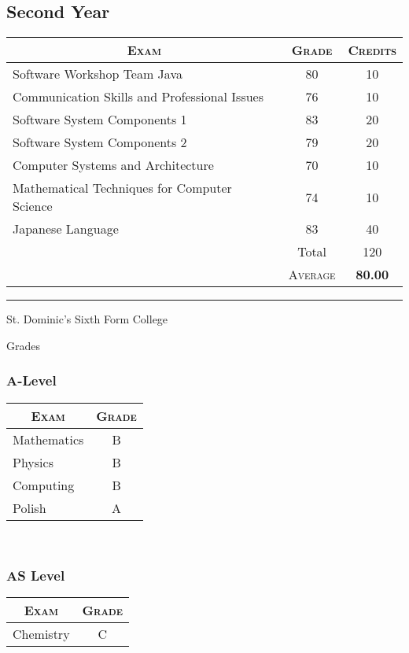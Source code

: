 \documentclass[a4paper,10pt]{article}
\begin{document}
\begin{center}
  \section{Second Year}
  \begin{tabular}{lcc}
    \multicolumn{1}{c}{\textsc{Exam}}&\textsc{Grade}&\textsc{Credits}\\ \hline
    Software Workshop Team Java&80&	10\\
    Communication Skills and Professional Issues	&76&	10\\
    Software System Components 1	&83&	20\\
    Software System Components 2	&79&	20\\
    Computer Systems and Architecture	&70&	10\\
    Mathematical Techniques for Computer Science	&74	&10\\
    Japanese Language	&83&	40\\\cline{2-3}
    & Total&120\\
    &\textsc{Average}&\textbf{80.00}
  \end{tabular}
\end{center}
\bigskip \hrule \bigskip
\par{\centering\Large \hypertarget{doms}{St. Dominic's Sixth Form
    College}\par}\large{\centering Grades\par}\normalsize
\begin{center}
  \subsubsection{A-Level}
  \begin{tabular}{lc}
    \multicolumn{1}{c}{\textsc{Exam}}&\textsc{Grade}\\ \hline
    Mathematics & B\\
    Physics	&B\\
    Computing&B\\
    Polish& A
  \end{tabular}\\
\end{center}
\begin{center}
  \subsubsection{AS Level}
  \begin{tabular}{lc}
    \multicolumn{1}{c}{\textsc{Exam}}&\textsc{Grade}\\ \hline
    Chemistry& C\\
  \end{tabular}\\
\end{center}\newpage
\end{document}
